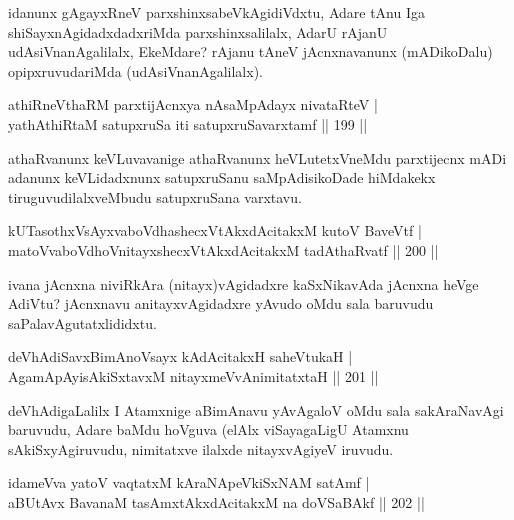 \begin{artha}
idanunx gAgayxRneV parxshinxsabeVkAgidiVdxtu, Adare tAnu Iga shiSayxnAgidadxdadxriMda parxshinxsalilalx, AdarU rAjanU udAsiVnanAgalilalx, EkeMdare? rAjanu tAneV jAcnxnavanunx (mADikoDalu) opipxruvudariMda (udAsiVnanAgalilalx).
\end{artha}

\begin{shl}
athiRneV\s thaRM parxtijAcnxya nAsaMpAdayx nivataRteV |\\
yathAthiRtaM satupxruSa  iti satupxruSavarxtamf \hfill || 199 ||
\end{shl}

\begin{artha}
athaRvanunx keVLuvavanige athaRvanunx heVLutetxVneMdu parxtijecnx mADi adanunx keVLidadxnunx satupxruSanu saMpAdisikoDade hiMdakekx tiruguvudilalxveMbudu \-satupxruSana varxtavu.
\end{artha}

\begin{shl}
kUTasothxV\s sAyxvaboVdhashecxVtAkxdAcitakxM kutoV BaveVtf |\\
matoV\s vaboVdhoV\s nitayxshecxVtAkxdAcitakxM tadA\s thaRvatf \hfill || 200 ||
\end{shl}

\begin{artha}
ivana jAcnxna niviRkAra (nitayx)vAgidadxre kaSxNikavAda jAcnxna heVge AdiVtu? jAcnxnavu anitayxvAgidadxre yAvudo oMdu sala baruvudu saPalavAgutatxlididxtu.
\end{artha}

\begin{shl}
deVhAdiSavxBimAnoV\s sayx kAdAcitakxH saheVtukaH |\\
AgamApAyisAkiSxtavxM nitayxmeVvAnimitatxtaH \hfill || 201 ||
\end{shl}


\begin{artha}
deVhAdigaLalilx I Atamxnige aBimAnavu yAvAgaloV oMdu sala sakAraNavAgi baruvudu, Adare baMdu hoVguva (elAlx viSayagaLigU Atamxnu sAkiSxyAgiruvudu, nimitatxve ilalxde nitayxvAgiyeV iruvudu.
\end{artha}

\begin{shl}
idameVva yatoV vaqtatxM kAraNApeVkiSxNAM satAmf |\\
aBUtAvx BavanaM tasAmxtAkxdAcitakxM na doVSaBAkf \hfill || 202 ||
\end{shl}

